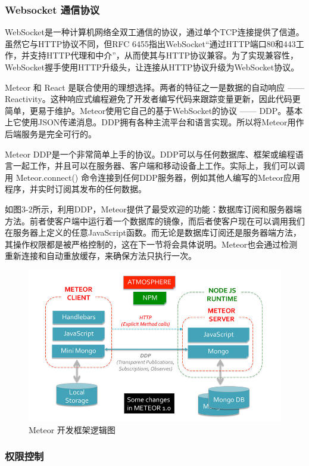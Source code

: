 \subsubsection{Websocket 通信协议}

WebSocket是一种计算机网络全双工通信的协议，通过单个TCP连接提供了信道。虽然它与HTTP协议不同，但RFC 6455指出WebSocket“通过HTTP端口80和443工作，并支持HTTP代理和中介”，从而使其与HTTP协议兼容。为了实现兼容性，WebSocket握手使用HTTP升级头，让连接从HTTP协议升级为WebSocket协议。

Meteor 和 React 是联合使用的理想选择。两者的特征之一是数据的自动响应 —— Reactivity。这种响应式编程避免了开发者编写代码来跟踪变量更新，因此代码更简单，更易于维护。Meteor使用它自己的基于WebSocket的协议 —— DDP。基本上它使用JSON传递消息。DDP拥有各种主流平台和语言实现。所以将Meteor用作后端服务是完全可行的。

Meteor DDP是一个非常简单上手的协议。DDP可以与任何数据库、框架或编程语言一起工作，并且可以在服务器、客户端和移动设备上工作。实际上，我们可以调用 Meteor.connect() 命令连接到任何DDP服务器，例如其他人编写的Meteor应用程序，并实时订阅其发布的任何数据。

如图3-2所示，利用DDP，Meteor提供了最受欢迎的功能：数据库订阅和服务器端方法。前者使客户端中运行着一个数据库的镜像，而后者使客户现在可以调用我们在服务器上定义的任意JavaScript函数。而无论是数据库订阅还是服务器端方法，其操作权限都是被严格控制的，这在下一节将会具体说明。Meteor也会通过检测重新连接和自动重放缓存，来确保方法只执行一次。

\begin{figure}
	\centering
	\includegraphics[width=0.85\linewidth]{figure/meteor-logic}
	\caption{Meteor 开发框架逻辑图}
\end{figure}

\subsubsection{权限控制}


